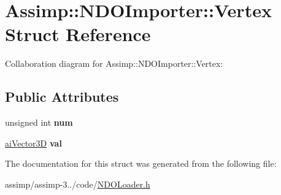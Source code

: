 \hypertarget{struct_assimp_1_1_n_d_o_importer_1_1_vertex}{\section{Assimp\+:\+:N\+D\+O\+Importer\+:\+:Vertex Struct Reference}
\label{struct_assimp_1_1_n_d_o_importer_1_1_vertex}
}


Collaboration diagram for Assimp\+:\+:N\+D\+O\+Importer\+:\+:Vertex\+:
\subsection*{Public Attributes}
\begin{DoxyCompactItemize}
\item 
\hypertarget{struct_assimp_1_1_n_d_o_importer_1_1_vertex_a12e5c11d3160280c9eef9f32facbecb2}{unsigned int {\bfseries num}}\label{struct_assimp_1_1_n_d_o_importer_1_1_vertex_a12e5c11d3160280c9eef9f32facbecb2}

\item 
\hypertarget{struct_assimp_1_1_n_d_o_importer_1_1_vertex_a5918544d53aeb4db5d8bb77900ff6065}{\hyperlink{structai_vector3_d}{ai\+Vector3\+D} {\bfseries val}}\label{struct_assimp_1_1_n_d_o_importer_1_1_vertex_a5918544d53aeb4db5d8bb77900ff6065}

\end{DoxyCompactItemize}


The documentation for this struct was generated from the following file\+:\begin{DoxyCompactItemize}
\item 
assimp/assimp-\/3../code/\hyperlink{_n_d_o_loader_8h}{N\+D\+O\+Loader.\+h}\end{DoxyCompactItemize}
